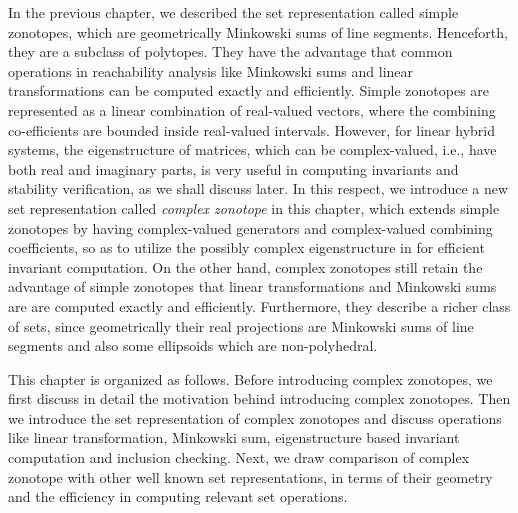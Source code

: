 In the previous chapter, we described the set representation called
simple zonotopes, which are geometrically Minkowski sums of line
segments.  Henceforth, they are a subclass of polytopes.  They have
the advantage that common operations in reachability analysis like
Minkowski sums and linear transformations can be computed exactly and
efficiently.  Simple zonotopes are represented as a linear combination
of real-valued vectors, where the combining co-efficients are bounded
inside real-valued intervals.  However, for linear hybrid systems, the
eigenstructure of matrices, which can be complex-valued, i.e., have
both real and imaginary parts, is very useful in computing invariants
and stability verification, as we shall discuss later.  In this
respect, we introduce a new set representation called \emph{complex
  zonotope} in this chapter, which extends simple zonotopes by having
complex-valued generators and complex-valued combining coefficients,
so as to utilize the possibly complex eigenstructure in for efficient
invariant computation.  On the other hand, complex zonotopes still
retain the advantage of simple zonotopes that linear transformations
and Minkowski sums are are computed exactly and efficiently.
Furthermore, they describe a richer class of sets, since geometrically
their real projections are Minkowski sums of line segments and also
some ellipsoids which are non-polyhedral.

This chapter is organized as follows.  Before introducing complex
zonotopes, we first discuss in detail the motivation behind
introducing complex zonotopes.  Then we introduce the set
representation of complex zonotopes and discuss operations like linear
transformation, Minkowski sum, eigenstructure based invariant
computation and inclusion checking.  Next, we draw comparison of
complex zonotope with other well known set representations, in terms of
their geometry and the efficiency in computing relevant set operations.
